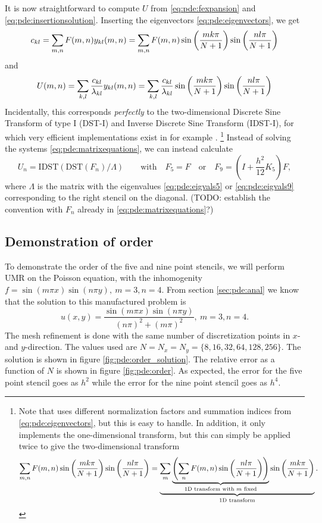 It is now straightforward to compute $U$ from \ref{eq:pde:fexpansion} and \ref{eq:pde:insertionsolution}.
Inserting the eigenvectors \ref{eq:pde:eigenvectors}, we get
$$
c_{kl} = \sum_{m,n} F(m,n) y_{kl}(m,n) 
       = \sum_{m,n} F(m,n) \sin \left( \frac{mk\pi}{N+1} \right) \sin \left( \frac{nl\pi}{N+1} \right)
$$
and
$$
U(m,n) = \sum_{k,l} \frac{c_{kl}}{\lambda_{kl}} y_{kl}(m,n) 
       = \sum_{k,l} \frac{c_{kl}}{\lambda_{kl}} \sin \left( \frac{mk\pi}{N+1} \right) \sin \left( \frac{nl\pi}{N+1} \right)
$$
Incidentally, this corresponds \emph{perfectly} to the two-dimensional Discrete Sine Transform of type I (DST-I) and Inverse Discrete Sine Transform (IDST-I), for which very efficient implementations exist in for example \cite{scipy_dst}.
\footnote{
	Note that \cite{scipy_dst} uses different normalization factors and summation indices from \ref{eq:pde:eigenvectors}, but this is easy to handle.
	In addition, it only implements the one-dimensional transform, but this can simply be applied twice to give the two-dimensional transform
	$$
		\sum_{m,n} F(m,n) \sin \left( \frac{mk\pi}{N+1} \right) \sin \left( \frac{nl\pi}{N+1} \right) 
		= \underbrace{\sum_m \underbrace{\left(\sum_n F(m,n) \sin\left(\frac{nl\pi}{N+1}\right)\right)}_{\text{1D transform with $m$ fixed}} \sin\left(\frac{mk\pi}{N+1}\right)}_{\text{1D transform}}.
	$$
}
Instead of solving the systems \ref{eq:pde:matrixequations}, we can instead calculate
\begin{equation*}
U_n = \text{IDST}(\text{DST}(F_n) / \Lambda)
\qquad \text{with} \quad
F_5 = F
\quad \text{or} \quad
F_9 = \left (I + \frac{h^2}{12} K_5 \right) F,
\end{equation*}
where $\Lambda$ is the matrix with the eigenvalues \ref{eq:pde:eigvals5} or \ref{eq:pde:eigvals9} corresponding to the right stencil on the diagonal.
(TODO: establish the convention with $F_n$ already in \ref{eq:pde:matrixequations}?)

\subsection{Demonstration of order}
To demonstrate the order of the five and nine point stencils, we will perform UMR on the Poisson equation, with the inhomogenity $f = \sin(m \pi x)\sin(n \pi y), ~m=3, n=4$.
From section \ref{sec:pde:anal} we know that the solution to this manufactured problem is
$$
u(x, y) =
\frac{
  \sin(m \pi x)\sin(n \pi y)
}{
  (n\pi)^2 + (m\pi)^2
}
, ~m=3, n=4.
$$
The mesh refinement is done with the same number of discretization points in $x$- and $y$-direction.
The values used are $N = N_x = N_y = \{8, 16, 32, 64, 128, 256\}$.
The solution is shown in figure \ref{fig:pde:order_solution}.
The relative error as a function of $N$ is shown in figure \ref{fig:pde:order}.
As expected, the error for the five point stencil goes as $h^2$ while the error for the nine point stencil goes as $h^4$.


